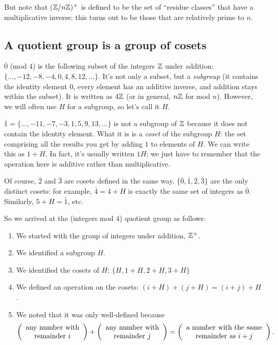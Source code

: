 But note that ($\mathbb{Z}/n\mathbb{Z})^\times$ is defined to be the set of ``residue classes​'' that have a multiplicative
inverse: this turns out to be those that are relatively prime to $n$.


\subsection{A quotient group is a group of cosets}

$\bar 0$ (mod $4$) is the following subset of the integers $\mathbb{Z}$ under addition:
$\{\ldots, -12, -8, -4, 0, 4, 8, 12, \ldots\}$. It's not only a subset, but a
\emph{subgroup} (it contains the identity element $0$, every element has an
additive inverse, and addition stays within the subset). It is written as $4\mathbb{Z}$
(or in general, $n\mathbb{Z}$ for mod $n$). However, we will often use $H$ for a
subgroup, so let's call it $H$.

$\bar 1 = \{\ldots, -11, -7, -3, 1, 5, 9, 13, \ldots\}$ is not a subgroup of
$\mathbb{Z}$ because it does not contain the identity element. What it is is a
\emph{coset} of the subgroup $H$: the set comprising all the results you get by
adding $1$ to elements of $H$. We can write this as $1 + H$. In fact, it's
usually written $1H$; we just have to remember that the operation here is
additive rather than multiplicative.

Of course, $\bar 2$ and $\bar 3$ are cosets defined in the same way. $\{\bar 0,
\bar 1, \bar 2, \bar 3\}$ are the only distinct cosets: for example, $\bar 4 =
4+H$ is exactly the same set of integers as $\bar 0$. Similarly, $5 + H = \bar
1$, etc.

So we arrived at the (integers mod $4$) quotient group as follows:

\begin{enumerate}
\item We started with the group of integers under addition, $\mathbb{Z}^+$.
\item We identified a subgroup $H$.
\item We identified the cosets of $H$: $\{H, 1+H, 2+H, 3+H\}$
\item We defined an operation on the cosets: $(i+H) + (j+H) = (i+j)+H$.
\item We noted that it was only well-defined because
  \begin{align*}
    \left(\begin{array}{c} \text{any number with} \\ \text{remainder $i$} \end{array}\right) +
    \left(\begin{array}{c} \text{any number with} \\ \text{remainder $j$} \end{array}\right) =
    \left(\begin{array}{c} \text{a number with the same} \\ \text{remainder as $i+j$} \end{array}\right).
  \end{align*}
\end{enumerate}

